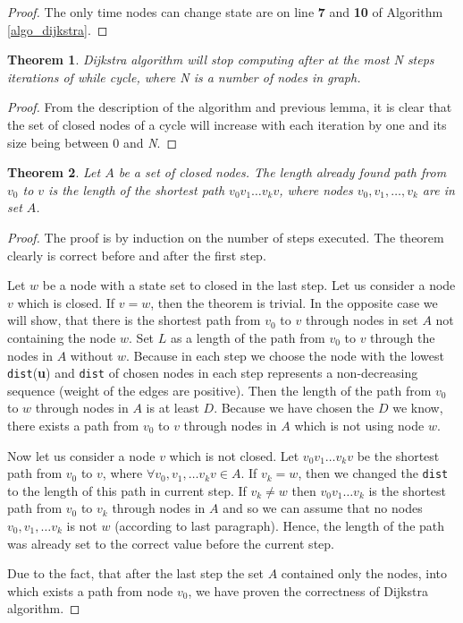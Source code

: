 \documentclass[thesis=M,english]{FITthesis}[2012/10/20]
\newtheorem{theorem}{Theorem}
\begin{document}
\begin{proof}
The only time nodes can change state are on line \textbf{7} and \textbf{10} of Algorithm \ref{algo_dijkstra}.
\end{proof}

\begin{theorem}
\label{theorem2}
Dijkstra algorithm will stop computing after at the most \textit{N} steps iterations of while cycle, where N is a number of nodes in graph. 
\end{theorem}

\begin{proof}
From the description of the algorithm and previous lemma, it is clear that the set of closed nodes of a cycle will increase with each iteration by one and its size being between 0 and \textit{N}.
\end{proof}

\begin{theorem}
Let $A$ be a set of closed nodes. The length already found path from $v_0$ to $v$ is the length of the shortest path $v_0 v_1 \dots v_k v$, where nodes $v_0, v_1, \dots , v_k$ are in set $A$.
\end{theorem}

\begin{proof}
The proof is by induction on the number of steps executed. The theorem clearly is correct before and after the first step. 

Let $w$ be a node with a state set to closed in the last step. Let us consider a node $v$ which is closed.
If $v=w$, then the theorem is trivial. In the opposite case we will show, that there is the shortest path from $v_0$ to $v$ through nodes in set $A$ not containing the node $w$. Set $L$ as a length of the path from $v_0$ to $v$ through the nodes in $A$ without $w$. Because in each step we choose the node with the lowest \texttt{dist}(\textbf{u}) and \texttt{dist} of chosen nodes in each step represents a non-decreasing sequence (weight of the edges are positive). Then the length of the path from $v_0$ to $w$ through nodes in $A$ is at least $D$. Because we have chosen the $D$ we know, there exists a path from $v_0$ to $v$ through nodes in $A$ which is not using node $w$.

Now let us consider a node $v$ which is not closed. Let $v_0 v_1 \dots v_k v$ be the shortest path from $v_0$ to $v$, where $\forall v_0, v_1, \dots v_k v \in A$. 
If $v_k = w$, then we changed the \texttt{dist} to the length of this path in current step. If $v_k \neq w$ then $v_0 v_1 \dots v_k$ is the shortest path from $v_0$ to $v_k$ through nodes in $A$ and so we can assume that no nodes $v_0, v_1, \dots v_k $ is not $w$ (according to last paragraph). Hence, the length of the path was already set to the correct value before the current step.

Due to the fact, that after the last step the set $A$ contained only the nodes, into which exists a path from node $v_0$, we have proven the correctness of Dijkstra algorithm.
\end{proof}
\end{document}
